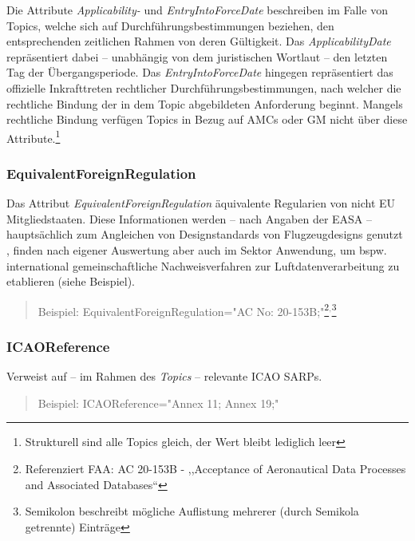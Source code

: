     Die Attribute \textit{Applicability-} und \textit{EntryIntoForceDate} beschreiben im Falle von Topics, welche sich auf Durchführungsbestimmungen beziehen, den entsprechenden zeitlichen Rahmen von deren Gültigkeit.
    Das \textit{ApplicabilityDate} repräsentiert dabei -- unabhängig von dem juristischen Wortlaut -- den letzten Tag der Übergangsperiode. 
    Das \textit{EntryIntoForceDate} hingegen repräsentiert das offizielle Inkrafttreten rechtlicher Durchführungsbestimmungen, nach welcher die rechtliche Bindung der in dem Topic abgebildeten Anforderung beginnt.
    \cite[21]{easa_xml_doc}
    Mangels rechtliche Bindung verfügen Topics in Bezug auf \acsp{AMC} oder \ac{GM} nicht über diese Attribute.\footnote{Strukturell sind alle Topics gleich, der Wert bleibt lediglich leer}
        
\subsubsection{EquivalentForeignRegulation}

    Das Attribut \textit{EquivalentForeignRegulation} äquivalente Regularien von nicht \ac{EU} Mitgliedstaaten.
    Diese Informationen werden -- nach Angaben der \ac{EASA} -- hauptsächlich zum Angleichen von Designstandards von Flugzeugdesigns genutzt \cite[22]{easa_xml_doc}, finden nach eigener Auswertung aber auch im \atmans Sektor Anwendung, um bspw. international gemeinschaftliche Nachweisverfahren zur Luftdatenverarbeitung zu etablieren (siehe Beispiel).
    
    \begin{quote}
        Beispiel:
        \textsf{EquivalentForeignRegulation="{}AC No: 20-153B;"}\footnote{Referenziert \ac{FAA}: \ac{AC} 20-153B - ,,Acceptance of Aeronautical Data Processes and Associated Databases``}$^,$\footnote{Semikolon beschreibt mögliche Auflistung mehrerer (durch Semikola getrennte) Einträge }
    \end{quote}

\subsubsection{ICAOReference}

    Verweist auf -- im Rahmen des \textit{Topics} -- relevante \ac{ICAO} \acp{SARP}. 
    \cite[23]{easa_xml_doc}
    \begin{quote}
        Beispiel:
        \textsf{ICAOReference="{}Annex 11; Annex 19;"}
    \end{quote}
    
